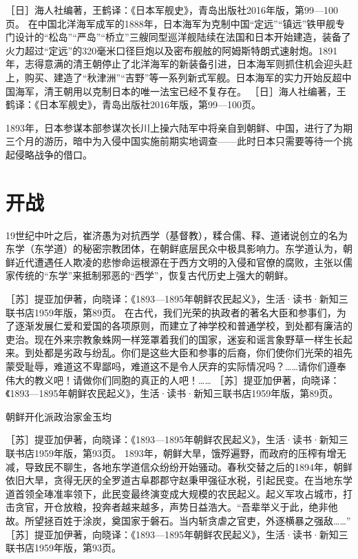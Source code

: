 \documentclass[12pt,UTF8]{ctexbook}
\begin{document}
［日］海人社编著，王鹤译：《日本军舰史》，青岛出版社2016年版，第99—100页。
在中国北洋海军成军的1888年，日本海军为克制中国“定远”“镇远”铁甲舰专门设计的“松岛”“严岛”“桥立”三艘同型巡洋舰陆续在法国和日本开始建造，装备了火力超过“定远”的320毫米口径巨炮以及密布舰舷的阿姆斯特朗式速射炮。1891年，志得意满的清王朝停止了北洋海军的新装备引进，日本海军则抓住机会迎头赶上，购买、建造了“秋津洲”“吉野”等一系列新式军舰。日本海军的实力开始反超中国海军，清王朝用以克制日本的唯一法宝已经不复存在。 ［日］海人社编著，王鹤译：《日本军舰史》，青岛出版社2016年版，第99—100页。

1893年，日本参谋本部参谋次长川上操六陆军中将亲自到朝鲜、中国，进行了为期三个月的游历，暗中为入侵中国实施前期实地调查——此时日本只需要等待一个挑起侵略战争的借口。

\section{开战}

19世纪中叶之后，崔济愚为对抗西学（基督教），糅合儒、释、道诸说创立的名为东学（东学道）的秘密宗教团体，在朝鲜底层民众中极具影响力。东学道认为，朝鲜近代遭遇任人欺凌的悲惨命运根源在于西方文明的入侵和官僚的腐败，主张以儒家传统的“东学”来抵制邪恶的“西学”，恢复古代历史上强大的朝鲜。

［苏］提亚加伊著，向晓译：《1893—1895年朝鲜农民起义》，生活·读书·新知三联书店1959年版，第89页。
在古代，我们光荣的执政者的著名大臣和参事们，为了逐渐发展仁爱和爱国的各项原则，而建立了神学校和普通学校，到处都有廉洁的吏治。现在外来宗教象蛛网一样笼罩着我们的国家，迷妄和谣言象野草一样生长起来。到处都是劣政与纷乱。你们是这些大臣和参事的后裔，你们使你们光荣的祖先蒙受耻辱，难道这不卑鄙吗，难道这不是令人厌弃的实际情况吗？……请你们遵奉伟大的教义吧！请做你们同胞的真正的人吧！…… ［苏］提亚加伊著，向晓译：《1893—1895年朝鲜农民起义》，生活·读书·新知三联书店1959年版，第89页。


朝鲜开化派政治家金玉均

［苏］提亚加伊著，向晓译：《1893—1895年朝鲜农民起义》，生活·读书·新知三联书店1959年版，第93页。
1893年，朝鲜大旱，饿殍遍野，而政府的压榨有增无减，导致民不聊生，各地东学道信众纷纷开始骚动。春秋交替之后的1894年，朝鲜依旧大旱，贪得无厌的全罗道古阜郡郡守赵秉甲强征水税，引起民变。在当地东学道首领全琫准率领下，此民变最终演变成大规模的农民起义。起义军攻占城市，打击贪官，开仓放粮，投奔者越来越多，声势日益浩大。“吾辈举义于此，绝非他故。所望拯百姓于涂炭，奠国家于磐石。当内斩贪虐之官吏，外逐横暴之强敌……” ［苏］提亚加伊著，向晓译：《1893—1895年朝鲜农民起义》，生活·读书·新知三联书店1959年版，第93页。
\end{document}
